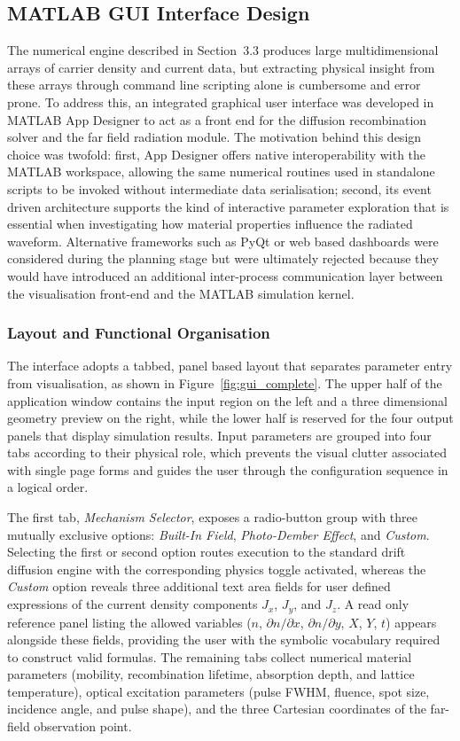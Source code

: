 \documentclass[12pt]{final_project_report}
\begin{document}
\subsection{MATLAB GUI Interface Design}
The numerical engine described in Section~3.3 produces large multidimensional arrays of carrier density and current data, but extracting physical insight from these arrays through command line scripting alone is cumbersome and error prone. To address this, an integrated graphical user interface was developed in MATLAB App Designer to act as a front end for the diffusion recombination solver and the far field radiation module. The motivation behind this design choice was twofold: first, App Designer offers native interoperability with the MATLAB workspace, allowing the same numerical routines used in standalone scripts to be invoked without intermediate data serialisation; second, its event driven architecture supports the kind of interactive parameter exploration that is essential when investigating how material properties influence the radiated waveform. Alternative frameworks such as PyQt or web based dashboards were considered during the planning stage but were ultimately rejected because they would have introduced an additional inter-process communication layer between the visualisation front-end and the MATLAB simulation kernel.

\subsubsection{Layout and Functional Organisation}
The interface adopts a tabbed, panel based layout that separates parameter entry from visualisation, as shown in Figure~\ref{fig:gui_complete}. The upper half of the application window contains the input region on the left and a three dimensional geometry preview on the right, while the lower half is reserved for the four output panels that display simulation results. Input parameters are grouped into four tabs according to their physical role, which prevents the visual clutter associated with single page forms and guides the user through the configuration sequence in a logical order.

The first tab, \textit{Mechanism Selector}, exposes a radio-button group with three mutually exclusive options: \textit{Built-In Field}, \textit{Photo-Dember Effect}, and \textit{Custom}. Selecting the first or second option routes execution to the standard drift diffusion engine with the corresponding physics toggle activated, whereas the \textit{Custom} option reveals three additional text area fields for user defined expressions of the current density components $J_x$, $J_y$, and $J_z$. A read only reference panel listing the allowed variables ($n$, $\partial n/\partial x$, $\partial n/\partial y$, $X$, $Y$, $t$) appears alongside these fields, providing the user with the symbolic vocabulary required to construct valid formulas. The remaining tabs collect numerical material parameters (mobility, recombination lifetime, absorption depth, and lattice temperature), optical excitation parameters (pulse FWHM, fluence, spot size, incidence angle, and pulse shape), and the three Cartesian coordinates of the far-field observation point.
\end{document}
